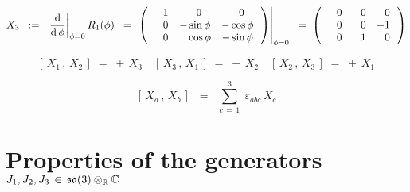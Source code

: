 \begin{equation*}
X_{3}
\;\; := \;\;
	\left.\dfrac{\d}{\d\,\phi}\right\vert_{\phi = 0} R_{1}(\phi)
\;\; = \;
	\left.\left(\,
		\begin{array}{ccc}
			{\color{white}-}1 & {\color{white}-}0 & {\color{white}-}0 \\
			{\color{white}-}0 & {\color{black}-}\sin\phi & {\color{black}-}\cos\phi \\
			{\color{white}-}0 & {\color{white}-}\cos\phi & {\color{black}-}\sin\phi \\
			\end{array}
		\,\right)\right\vert_{\phi = 0}
\;\; = \;
	\left(\,
		\begin{array}{ccc}
			{\color{white}-}0 & {\color{white}-}0 & {\color{white}-}0 \\
			{\color{white}-}0 & {\color{white}-}0 & {\color{black}-}1 \\
			{\color{white}-}0 & {\color{white}-}1 & {\color{white}-}0 \\
			\end{array}
		\,\right)
\end{equation*}

\vskip 0.5cm
\begin{equation*}
\left[\,X_{1}\,,\,X_{2}\,\right] \;=\; +\,X_{3}
\quad
\left[\,X_{3}\,,\,X_{1}\,\right] \;=\; +\,X_{2}
\quad
\left[\,X_{2}\,,\,X_{3}\,\right] \;=\; +\,X_{1}
\end{equation*}

\vskip 0.5cm
\begin{equation*}
\left[\,X_{a}\,,\,X_{b}\,\right] \;\;=\;\; \overset{3}{\underset{c\,=\,1}{\sum}}\;\varepsilon_{abc}\,X_{c}
\end{equation*}


\vskip 0.5cm
\section{Properties of the generators \,$J_{1}, J_{2}, J_{3} \,\in\, \mathfrak{so}(3) \otimes_{\mathbb{R}} \mathbb{C}$}


